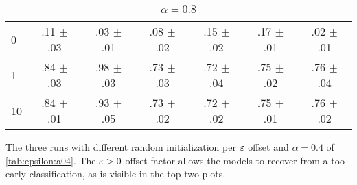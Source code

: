 \begin{frame}
\begin{table}
\begin{subtable}{.5\textwidth}
\begin{tabular}{lcccccc}
			0 & .11 $\pm$ .03 & .03 $\pm$ .01 & .08 $\pm$ .02 & .15 $\pm$ .02 & .17 $\pm$ .01 & .02 $\pm$ .01 \\
			1 & .84 $\pm$ .03 & .98 $\pm$ .03 & .73 $\pm$ .03 & .72 $\pm$ .04 & .75 $\pm$ .02 & .76 $\pm$ .04 \\
			10 & .84 $\pm$ .01 & .93 $\pm$ .05 & .73 $\pm$ .02 & .72 $\pm$ .02 & .75 $\pm$ .01 & .76 $\pm$ .02 \\
			\bottomrule
		\end{tabular}
		\caption{\emph{$\alpha=0.8$}}
		\label{tab:epsilon:a08}
	\end{subtable}
	
\end{table}

\end{frame}



\begin{frame}


\figepsilonzero
{The three runs with different random initialization per $\varepsilon$ offset and $\alpha=0.4$ of \cref{tab:epsilon:a04}.
The $\varepsilon>0$ offset factor allows the models to recover from a too early classification, as is visible in the top two plots.}

\end{frame}

